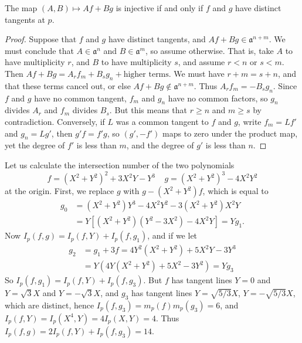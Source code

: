 \begin{lemma}
    The map $(A,B) \mapsto Af + Bg$ is injective if and only if $f$ and $g$ have distinct tangents at $p$.
\end{lemma}
\begin{proof}
    Suppose that $f$ and $g$ have distinct tangents, and $Af + Bg \in \mathfrak{a}^{n+m}$. We must conclude that $A \in \mathfrak{a}^n$ and $B \in \mathfrak{a}^m$, so assume otherwise. That is, take $A$ to have multiplicity $r$, and $B$ to have multiplicity $s$, and assume $r < n$ or $s < m$. Then $Af + Bg = A_rf_m + B_sg_n + \text{higher terms}$. We must have $r + m = s + n$, and that these terms cancel out, or else $Af + Bg \not \in \mathfrak{a}^{n+m}$. Thus $A_rf_m = -B_sg_n$. Since $f$ and $g$ have no common tangent, $f_m$ and $g_n$ have no common factors, so $g_n$ divides $A_r$ and $f_m$ divides $B_s$. But this means that $r \geq n$ and $m \geq s$ by contradiction. Conversely, if $L$ was a common tangent to $f$ and $g$, write $f_m = Lf'$ and $g_n = Lg'$, then $g'f = f'g$, so $(g',-f')$ maps to zero under the product map, yet the degree of $f'$ is less than $m$, and the degree of $g'$ is less than $n$.
\end{proof}

\begin{example}
    Let us calculate the intersection number of the two polynomials
    \[ f = (X^2 + Y^2)^2 + 3X^2Y - Y^3\ \ \ \ \ g = (X^2 + Y^2)^3 - 4X^2Y^2 \]
    at the origin. First, we replace $g$ with $g-(X^2 + Y^2)f$, which is equal to
    \begin{align*}
        g_0 &= (X^2 + Y^2)Y^3 - 4X^2Y^2 - 3(X^2 + Y^2)X^2Y\\
        &= Y[(X^2 + Y^2)(Y^2 - 3X^2) - 4X^2Y] = Yg_1.
    \end{align*}
    Now $I_p(f,g) = I_p(f,Y) + I_p(f,g_1)$, and if we let
    \begin{align*}
        g_2 &= g_1 + 3f = 4Y^2(X^2 + Y^2) + 5X^2Y - 3Y^3\\
        &= Y(4Y(X^2 + Y^2) + 5X^2 - 3Y^2) = Yg_3
    \end{align*}
    So $I_p(f,g_1) = I_p(f,Y) + I_p(f,g_3)$. But $f$ has tangent lines $Y = 0$ and $Y = \sqrt{3}X$ and $Y = -\sqrt{3}X$, and $g_3$ has tangent lines $Y = \sqrt{5/3}X$, $Y = -\sqrt{5/3}X$, which are distinct, hence $I_p(f,g_3) = m_p(f)m_p(g_3) = 6$, and $I_p(f,Y) = I_p(X^4,Y) = 4I_p(X,Y) = 4$. Thus $I_p(f,g) = 2I_p(f,Y) + I_p(f,g_3) = 14$.
\end{example}

